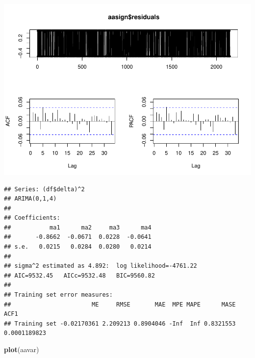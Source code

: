 \documentclass[11pt, a4paper]{report}
\newenvironment{Shaded}{\begin{snugshade}}{\end{snugshade}}
\newcommand{\DataTypeTok}[1]{\textcolor[rgb]{0.13,0.29,0.53}{#1}}
\newcommand{\DecValTok}[1]{\textcolor[rgb]{0.00,0.00,0.81}{#1}}
\newcommand{\KeywordTok}[1]{\textcolor[rgb]{0.13,0.29,0.53}{\textbf{#1}}}
\newcommand{\NormalTok}[1]{#1}
\newcommand{\OperatorTok}[1]{\textcolor[rgb]{0.81,0.36,0.00}{\textbf{#1}}}
\newcommand{\StringTok}[1]{\textcolor[rgb]{0.31,0.60,0.02}{#1}}
\theoremstyle{plain}
\theoremstyle{plain}
\theoremstyle{remark}
\begin{document}
\begin{center}\includegraphics{Econo2_P1_files/figure-latex/auto arima-4} \end{center}

\begin{Shaded}
\end{Shaded}

\begin{verbatim}
## Series: (df$delta)^2 
## ARIMA(0,1,4) 
## 
## Coefficients:
##           ma1      ma2     ma3      ma4
##       -0.8662  -0.0671  0.0228  -0.0641
## s.e.   0.0215   0.0284  0.0280   0.0214
## 
## sigma^2 estimated as 4.892:  log likelihood=-4761.22
## AIC=9532.45   AICc=9532.48   BIC=9560.82
## 
## Training set error measures:
##                       ME     RMSE       MAE  MPE MAPE      MASE         ACF1
## Training set -0.02170361 2.209213 0.8904046 -Inf  Inf 0.8321553 0.0001189823
\end{verbatim}

\begin{Shaded}
\begin{Highlighting}[]
\KeywordTok{plot}\NormalTok{(aavar)}
\end{Highlighting}
\end{Shaded}
\end{document}

